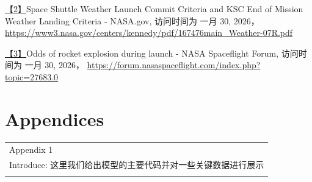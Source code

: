 \underline{【2】}Space Shuttle Weather Launch Commit Criteria and KSC
End of Mission Weather Landing Criteria - NASA.gov, 访问时间为 一月 30,
2026，
\underline{https://www3.nasa.gov/centers/kennedy/pdf/167476main\_Weather-07R.pdf}

\underline{【3】}Odds of rocket explosion during launch - NASA
Spaceflight Forum, 访问时间为 一月 30, 2026，
\underline{https://forum.nasaspaceflight.com/index.php?topic=27683.0}

\hypertarget{appendices}{%
\section{Appendices}\label{appendices}}

\begin{longtable}[]{@{}l@{}}
\toprule
\endhead
Appendix 1 \\
Introduce: 这里我们给出模型的主要代码并对一些关键数据进行展示 \\
 \\
\bottomrule
\end{longtable}
